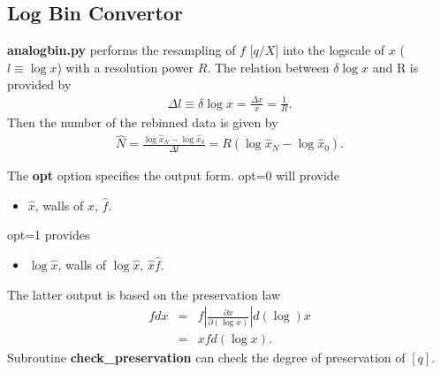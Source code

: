 \documentclass[iop, twocolumn, tighten]{emulateapj}
\begin{document}
\subsection{Log Bin Convertor}

{\bf analogbin.py} performs the resampling of $f$ [$q/X$] into the logscale of $x$ ($l \equiv \log x$) with a resolution power $R$. The relation between $\delta \log x$ and R is provided by
\begin{eqnarray}
\Delta l \equiv \delta \log x = \frac{\Delta x}{x} = \frac{1}{R}.
\end{eqnarray}
Then the number of the rebinned data is given by 
\begin{eqnarray}
\hat{N} = \frac{\log \hat{x}_N  - \log \hat{x}_0}{\Delta l} = R (\log \hat{x}_N  - \log \hat{x}_0).
\end{eqnarray}

The {\bf opt} option specifies the output form. opt=0 will provide
\begin{itemize}
\item $\hat{x}$, walls of $\hat{x}$, $\hat{f}$.
\end{itemize}
opt=1 provides
\begin{itemize}
\item $\log \hat{x}$, walls of $\log \hat{x}$, $\hat{x} \hat{f}$.
\end{itemize}
The latter output is based on the preservation law
\begin{eqnarray}
f d x &=& f \left| \frac{\partial x}{\partial (\log x)}\right| d (\log) x \nonumber \\
&=&   x f d (\log x).
\end{eqnarray}
Subroutine {\bf check\_preservation} can check the degree of preservation of $[q]$. 
\end{document}
